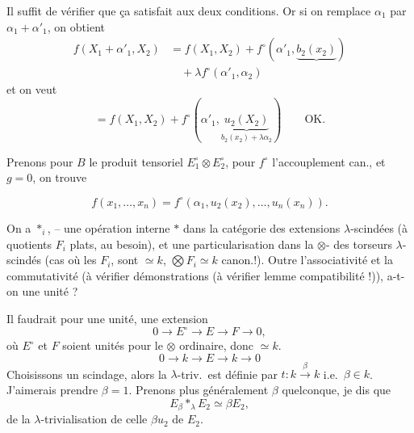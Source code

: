 \documentclass[11pt,a4paper]{article}
\begin{document}
Il suffit de vérifier que ça satisfait aux deux conditions. Or si on remplace $\alpha_1$ par $\alpha_1 + \alpha'_1$, on obtient
\begin{align*}
  f(X_1 + \alpha'_1, X_2) &= f(X_1, X_2) + f^{\circ}(\alpha'_1, \underbrace{b_2(x_2)}) \\
  &\quad + \lambda f^{\circ}(\alpha'_1, \alpha_2)
\end{align*}
et on veut
\[
  = f(X_1, X_2) + f^{\circ}(\alpha'_1, \underbrace{u_2(X_2)}_{b_2(x_2) + \lambda\alpha_2})
  \qquad \text{OK.}
\]

Prenons pour $B$ le produit tensoriel $E_1^{\circ} \otimes E_2^{\circ}$, pour $f^{\circ}$ l'accouplement can., et $g = 0$, on trouve

\[
  f(x_1, \ldots, x_n) = f^{\circ}(\alpha_1, u_2(x_2), \ldots, u_n(x_n)) .
\]

On a $\ast_{i}$, \ill{} -- une opération interne $\ast$ dans la catégorie des extensions $\lambda$-scindées (à quotients $F_i$ plats, au besoin), et une particularisation dans la $\otimes$- des torseurs $\lambda$-scindés (cas où les $F_i$, sont $\simeq k$, $\bigotimes F_i \simeq k$ canon.!). \struck{\ill{}} Outre l'associativité et la commutativité (à vérifier   démonstrations (à vérifier lemme compatibilité !)), a-t-on une unité ?

Il faudrait pour une unité,   une extension
\[
  0 \longrightarrow E^{\circ} \longrightarrow E \longrightarrow F \longrightarrow 0,
\]
où $E^{\circ}$ et $F$ soient unités pour le $\otimes$ ordinaire, donc  $\simeq k$.
\[
  0 \longrightarrow k \longrightarrow E \longrightarrow k \longrightarrow 0
\]
 Choisissons un scindage, alors la $\lambda$-triv.\ est définie par \struck{\ill{}} $t : k \xrightarrow{\ \beta\ } k$ i.e.\ $\beta \in k$. J'aimerais prendre $\beta = 1$. Prenons plus généralement $\beta$ quelconque, je dis que
\[
  E_\beta \mathbin{\ast_\lambda} E_2 \simeq \beta E_2 ,
\]
 de la $\lambda$-trivialisation  de celle $\beta u_2$ de $E_2$.
\end{document}
